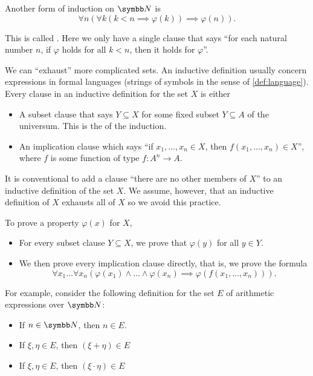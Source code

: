 \begin{remark}
  Another form of induction on \( \N \) is
  \begin{equation*}
    \forall n (\forall k (k < n \implies \varphi(k)) \implies \varphi(n)).
  \end{equation*}

  This is called . Here we only have a single clause that says \enquote{for each natural number \( n \), if \( \varphi \) holds for all \( k < n \), then it holds for \( \varphi \)}.

  We can \enquote{exhaust} more complicated sets. An inductive definition usually concern expressions in formal languages (strings of symbols in the sense of \cref{def:language}). Every clause in an inductive definition for the set \( X \) is either
  \begin{itemize}
    \item A subset clause that says \( Y \subseteq X \) for some fixed subset \( Y \subseteq A \) of the universum. This is the  of the induction.
    \item An implication clause which says \enquote{if \( x_1, \ldots, x_n \in X \), then \( f(x_1, \ldots, x_n) \in X \)}, where \( f \) is some function of type \( f: A^n \to A \).
  \end{itemize}

  It is conventional to add a clause \enquote{there are no other members of \( X \)} to an inductive definition of the set \( X \). We assume, however, that an inductive definition of \( X \) exhausts all of \( X \) so we avoid this practice.

  To prove a property \( \varphi(x) \) for \( X \),
  \begin{itemize}
    \item For every subset clause \( Y \subseteq X \), we prove that \( \varphi(y) \) for all \( y \in Y \).
    \item We then prove every implication clause directly, that is, we prove the formula
    \begin{equation*}
      \forall x_1 \ldots \forall x_n (\varphi(x_1) \land \ldots \land \varphi(x_n) \implies \varphi(f(x_1, \ldots, x_n))).
    \end{equation*}
  \end{itemize}

  For example, consider the following definition for the set \( E \) of arithmetic expressions over \( \N \):
  \begin{itemize}
    \item If \( n \in \N \), then \( n \in E \).
    \item If \( \xi, \eta \in E \), then \( (\xi + \eta) \in E \)
    \item If \( \xi, \eta \in E \), then \( (\xi \cdot \eta) \in E \)
  \end{itemize}


\end{remark}
